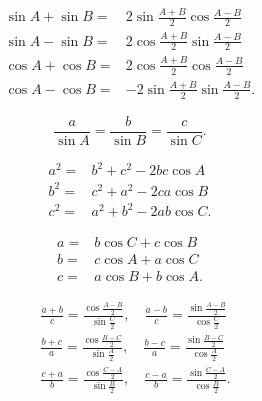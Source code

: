 \begin{ftheorem}
\normalfont 
\[
\begin{split}
	\sin A + \sin B = & 2 \sin \frac{A + B}{2}\cos \frac{A - B}{2} \\
	\sin A - \sin B = & 2 \cos \frac{A + B}{2} \sin \frac{A - B}{2} \\
	\cos A + \cos B = & 2 \cos \frac{A + B}{2} \cos \frac{A - B}{2} \\
	\cos A - \cos B = & - 2 \sin \frac{A + B}{2} \sin \frac{A - B}{2}.
\end{split}
\]
\end{ftheorem}
\begin{ftheorem}
\normalfont 
\[\frac{a}{\sin A} = \frac{b}{\sin B} = \frac{c}{\sin C} .\]
\end{ftheorem}
\begin{ftheorem}
\normalfont 
\[
\begin{split}
	a^{2} = & b^{2} + c^{2} - 2bc \cos A\\
	b^{2} = & c^{2} + a^{2} - 2ca \cos B \\
	c^{2} = & a^{2} + b^{2} - 2ab \cos C.
\end{split}
\]
\end{ftheorem}
\begin{ftheorem}
\normalfont 
\[
\begin{split}
	a = & b\cos C + c \cos B \\
	b = & c \cos A + a \cos C \\
	c = & a \cos B + b \cos A.
\end{split}
\]
\end{ftheorem}
\begin{ftheorem}
\normalfont 
\[
\begin{split}
& \frac{a + b}{c} = \frac{\cos \frac{A - B}{2}}{\sin \frac{C}{2}}, \quad \frac{a - b}{c} = \frac{\sin \frac{A - B}{2}}{\cos \frac{C}{2}} \\
& \frac{b + c}{a} = \frac{\cos \frac{B - C}{2}}{\sin \frac{A}{2}}, \quad \frac{b - c}{a} = \frac{\sin \frac{B - C}{2}}{\cos \frac{A}{2}} \\
& \frac{c + a}{b} = \frac{\cos \frac{C - A}{2}}{\sin \frac{B}{2}}, \quad \frac{c - a}{b} = \frac{\sin \frac{C - A}{2}}{\cos \frac{B}{2}}.
\end{split}
\]
\end{ftheorem}
